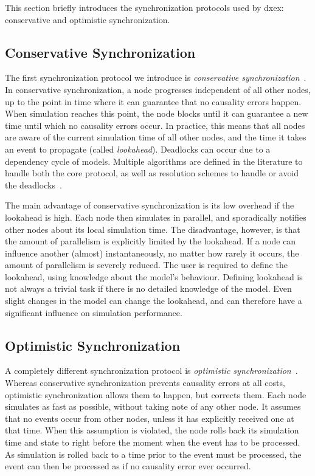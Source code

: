 This section briefly introduces the synchronization protocols used by dxex: conservative and optimistic synchronization.

\subsection{Conservative Synchronization}
The first synchronization protocol we introduce is \textit{conservative synchronization}~\cite{FujimotoBook}.
In conservative synchronization, a node progresses independent of all other nodes, up to the point in time where it can guarantee that no causality errors happen.
When simulation reaches this point, the node blocks until it can guarantee a new time until which no causality errors occur.
In practice, this means that all nodes are aware of the current simulation time of all other nodes, and the time it takes an event to propagate (called \textit{lookahead}).
Deadlocks can occur due to a dependency cycle of models.
Multiple algorithms are defined in the literature to handle both the core protocol, as well as resolution schemes to handle or avoid the deadlocks~\cite{FujimotoBook}.

The main advantage of conservative synchronization is its low overhead if the lookahead is high.
Each node then simulates in parallel, and sporadically notifies other nodes about its local simulation time.
The disadvantage, however, is that the amount of parallelism is explicitly limited by the lookahead.
If a node can influence another (almost) instantaneously, no matter how rarely it occurs, the amount of parallelism is severely reduced.
The user is required to define the lookahead, using knowledge about the model's behaviour.
Defining lookahead is not always a trivial task if there is no detailed knowledge of the model.
Even slight changes in the model can change the lookahead, and can therefore have a significant influence on simulation performance.

\subsection{Optimistic Synchronization}
A completely different synchronization protocol is \textit{optimistic synchronization}~\cite{TimeWarp}.
Whereas conservative synchronization prevents causality errors at all costs, optimistic synchronization allows them to happen, but corrects them.
Each node simulates as fast as possible, without taking note of any other node.
It assumes that no events occur from other nodes, unless it has explicitly received one at that time.
When this assumption is violated, the node rolls back its simulation time and state to right before the moment when the event has to be processed.
As simulation is rolled back to a time prior to the event must be processed, the event can then be processed as if no causality error ever occurred.

